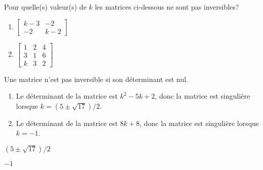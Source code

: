 \begin{exercice}
  Pour quelle(s) valeur(s) de $k$ les matrices ci-dessous ne sont
  pas inversibles?
  \begin{enumerate}
  \item $%
    \begin{bmatrix}
      k-3 & -2 \\ -2 & k-2
    \end{bmatrix}$
  \item $%
    \begin{bmatrix}
      1 & 2 & 4 \\ 3 & 1 & 6 \\ k & 3 & 2
    \end{bmatrix}$
  \end{enumerate}
  \begin{sol}
    Une matrice n'est pas inversible si son déterminant est nul.
    \begin{enumerate}
    \item Le déterminant de la matrice est $k^2 - 5k + 2$, donc la
      matrice est singulière lorsque $k = (5 \pm \sqrt{17})/2$.
    \item Le déterminant de la matrice est $8k + 8$, donc la
      matrice est singulière lorsque $k = -1$.
    \end{enumerate}
  \end{sol}
  \begin{rep}
    \begin{inparaenum}
    \item $(5 \pm \sqrt{17})/2$
    \item $-1$
    \end{inparaenum}
  \end{rep}
\end{exercice}

